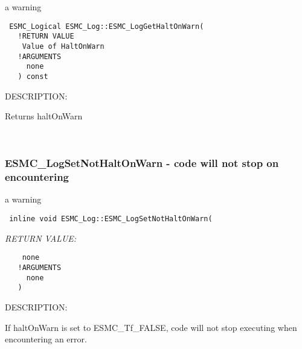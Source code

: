    a warning
  
\begin{verbatim} 
 ESMC_Logical ESMC_Log::ESMC_LogGetHaltOnWarn(
   !RETURN VALUE
    Value of HaltOnWarn
   !ARGUMENTS
     none
   ) const
 \end{verbatim}
{\sf DESCRIPTION:\\ }


   Returns haltOnWarn
    
 
\mbox{}\hrulefill\ 
 

  \subsubsection [ESMC\_LogSetNotHaltOnWarn] {ESMC\_LogSetNotHaltOnWarn - code will not stop on encountering}


   a warning
  
\begin{verbatim} 
 inline void ESMC_Log::ESMC_LogSetNotHaltOnWarn(\end{verbatim}{\em RETURN VALUE:}
\begin{verbatim}    none
   !ARGUMENTS
     none
   )
 \end{verbatim}
{\sf DESCRIPTION:\\ }


   If haltOnWarn is set to ESMC\_Tf\_FALSE, code will not stop executing when
   encountering an error.
   
